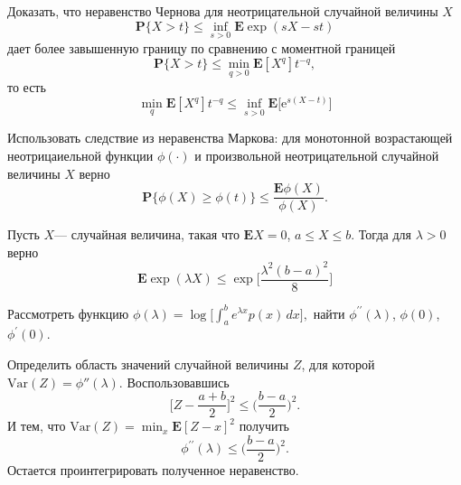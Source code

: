 \begin{problem}

Доказать, что неравенство Чернова для неотрицательной случайной величины $X$
\begin{equation*}
\mathbf{P}\{ X >t\}\leq \inf_{s>0}\mathbf{E}\exp(sX-st)
\end{equation*}
 дает более завышенную границу по сравнению с моментной границей
\begin{equation*}
\mathbf{P}\{ X >t\}\leq \min_{q>0}\mathbf{E}[X^q]t^{-q},
\end{equation*}
 то есть 
\begin{equation*}
\min_q\mathbf{E}[X^q]t^{-q}\leq \inf_{s>0}\mathbf{E}\big[\text{e}^{s(X-t)}\bigl]
\end{equation*}
\end{problem}

\begin{remark} Использовать следствие из неравенства Маркова: для монотонной возрастающей неотрицаиельной функции $\phi(\cdot)$ и произвольной неотрицательной случайной величины $X$ верно
\begin{equation*}
\mathbf{P}\{\phi(X)\geq \phi(t)\}\leq \frac{\mathbf{E}\phi(X)}{\phi(X)}.
\end{equation*}
\end{remark}



\begin{problem} Пусть $X$--- случайная величина, такая что $\mathbf{E}X =0$, $a\leq X\leq b$. Тогда для $\lambda>0$ верно
\begin{equation*}
\mathbf{E}\exp(\lambda X)\leq \exp\bigg[\frac{\lambda^2(b-a)^2}{8}\biggr]
\end{equation*}
\end{problem}

\begin{remark}
Рассмотреть функцию
$
\phi(\lambda) = \log\bigg[\int_a^be^{\lambda x}p(x) \, d x\biggr],%
$
найти $\phi^{\prime\prime}(\lambda)$,   $\phi(0)$, $\phi^{\prime}(0)$.

Определить область значений случайной величины  $Z$, для которой $\text{Var}(Z) = \phi''(\lambda)$. 
Воспользовавшись 
\begin{equation*}
\bigg[Z-\frac{a+b}{2}\biggr]^2\leq \bigg(\frac{b-a}{2}\biggl)^2.
\end{equation*}
И тем, что $\text{Var}(Z) = \min_{x}\mathbf{E}[Z-x]^2$
получить  
\begin{equation*}
\phi^{\prime\prime}(\lambda)\leq \bigg(\frac{b-a}{2}\biggl)^2.
\end{equation*}
Остается проинтегрировать полученное неравенство.
\end{remark}

